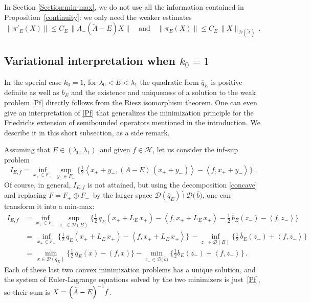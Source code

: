 \documentclass[12pt,reqno]{amsart}
\newcommand{\innerproduct}[2]{\left\langle #1, #2 \right\rangle}
\newcommand{\be}[1]{\begin{equation}\label{#1}}
\newcommand{\ee}{\end{equation}}
\renewcommand{\(}{\left(}
\renewcommand{\)}{\right)}
\begin{document}
\begin{remark}\label{simplified}
In Section \ref{Section:min-max}, we do not use all the information contained in Proposition~\ref{continuity}: we only need the weaker estimates
\be{continuous}
\| \pi'_E (X)\|\le C_E\,\| \Lambda_-(\widetilde A -E)X\|\quad\mbox{and}\quad\| \pi_E (X)\|\le C_E\,\| X \|_{\mathcal D(\widetilde A)} \,.
\ee
\end{remark}

\subsection{Variational interpretation when \texorpdfstring{$k_0=1$}{k0=1}}\label{Section: variationalinterpretation}

In the special case $k_0=1$, for $\lambda_0<E<\lambda_1$ the quadratic form $\overline{q}_E$ is positive definite as well as $\overline{b}_E$ and the existence and uniqueness of a solution to the weak problem \eqref{Pf} directly follows from the Riesz isomorphism theorem. One can even give an interpretation of \eqref{Pf} that generalizes the minimization principle for the Friedrichs extension of semibounded operators mentioned in the introduction. We describe it in this short subsection, as a side remark.

\noindent Assuming that $E\in(\lambda_0,\lambda_1)\,$ and given $f\in \mathcal H$, let us consider the inf-sup problem
\[
I_{E,f}=\inf_{x_+\in F_+}\, \sup_{y_-\in F_-} \Big\{ \tfrac12\innerproduct{x_++y_-}{(A-E)\,(x_++y_-)} - \innerproduct{f}{x_++y_-}\Big\}\,.
\]
Of course, in general, $I_{E,f}$ is not attained, but using the decomposition \eqref{concave} and replacing $F=F_+\oplus F_-\,$ by the larger space $\mathcal D(\overline{q}_E)\dot{+}\mathcal D\big(\,\overline{b}\big)$, one can transform it into a min-max:
\begin{align*}
I_{E,f}&=\inf_{x_+\in F_+}\, \sup_{z_-\in \mathcal D(B)} \Big\{ \tfrac12\,q_E(x_+ + L_E\,x_+ )-\innerproduct{f}{x_++L_E\,x_+}
-\tfrac12\,\overline{b}_E(z_-)- \innerproduct{f}{z_-}\Big\}\\
&=\, \inf_{x_+\in F_+} \Big\{ \tfrac12\,q_E(x_+ + L_E\,x_+ )-\innerproduct{f}{x_++L_E\,x_+} \Big\}\,-\inf_{z_-\in \mathcal D(B)} \Big\{ \tfrac12\,\overline{b}_E(z_-)+ \innerproduct{f}{z_-}\Big\}\\
&=\, \min_{x\in \mathcal D(\overline{q}_E)}\Big\{\tfrac12\, \overline q_E(x)-(f, x)\Big\}-\min_{z_-\in \mathcal D\big(\,\overline{b}\big)}\Big\{ \tfrac12 \overline{b}_E (z_-)+ \innerproduct{f}{z_-}\Big\}\,.
\end{align*}
Each of these last two convex minimization problems has a unique solution, and the system of Euler-Lagrange equations solved by the two minimizers is just~\eqref{Pf}, so their sum is $X=\(\widetilde A-E\)^{-1}\kern-2ptf$.
\end{document}
